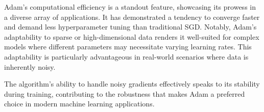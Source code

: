 Adam's computational efficiency is a standout feature, showcasing its prowess in a diverse array of applications. It has demonstrated a tendency to converge faster and demand less hyperparameter tuning than traditional SGD. Notably, Adam's adaptability to sparse or high-dimensional data renders it well-suited for complex models where different parameters may necessitate varying learning rates. This adaptability is particularly advantageous in real-world scenarios where data is inherently noisy.

The algorithm's ability to handle noisy gradients effectively speaks to its stability during training, contributing to the robustness that makes Adam a preferred choice in modern machine learning applications.%


%
%
